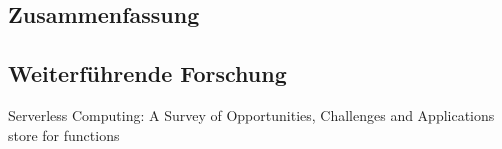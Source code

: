 \documentclass[11pt]{article}
\begin{document}
\subsection{Zusammenfassung}
\subsection{Weiterführende Forschung}
Serverless Computing: A Survey of Opportunities, Challenges and Applications store for functions
\cite{shahrad2019architectural}
\newpage
\printbibliography%
\end{document}
